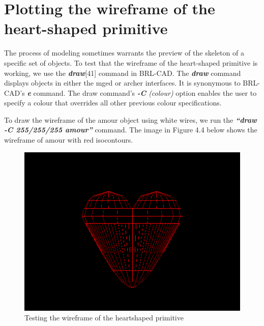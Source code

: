 \section{Plotting the wireframe of the heart­-shaped primitive}

\hspace{30} The   process   of   modeling   sometimes   warrants   the   preview   of   the   skeleton  
of   a   specific   set   of   objects.   To   test   that   the   wireframe   of   the   heart­-shaped  
primitive   is   working,   we   use   the   \textit{\textbf{draw}}[41]   command   in   BRL­-CAD.   The   \textit{\textbf{draw}}  
command   displays   objects   in   either   the   mged   or   archer   interfaces.   It   is  
synonymous   to   BRL­-CAD's   \textit{\textbf{e}}   command.   The   draw   command's   \textit{\textbf{-­C} (colour)}  
option   enables   the   user   to   specify   a   colour   that   overrides   all   other   previous  
colour specifications.  

\hspace{30} To   draw   the   wireframe   of   the   amour   object   using   white   wires,   we   run   the  
\textit{\textbf{“draw -­C 255/255/255 amour”}}   command.   The   image   in   Figure   4.4   below   shows  
the wireframe of amour with red iso­contours.  

\begin{figure}[htbp]
\centering
\includegraphics[trim=0.0cm 0.5cm 0.1cm 0.1cm, clip=true, totalheight=0.4\textheight]{Pictures/Wireframe.png}
\caption[Testing the wireframe of the heart­shaped primitive]{Testing the wireframe of the heart­shaped primitive}
\label{Wireframe}
\end{figure}

